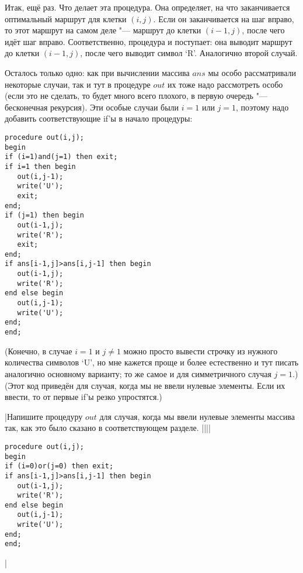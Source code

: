 Итак, ещё раз. Что делает эта процедура. Она определяет, на что заканчивается оптимальный маршрут
для клетки $(i,j)$. Если он заканчивается на шаг вправо, то этот маршрут на самом деле "--- маршрут
до клетки $(i-1,j)$, после чего идёт шаг вправо. Соответственно, процедура и поступает: она выводит
маршрут до клетки $(i-1,j)$, после чего выводит символ `R'. Аналогично второй случай.

Осталось только одно: как при вычислении массива $ans$ мы особо рассматривали некоторые случаи, так и тут в процедуре $out$ их тоже надо рассмотреть особо (если это не сделать, то будет много всего плохого, в первую очередь "--- бесконечная рекурсия). Эти особые случаи были $i=1$ или $j=1$, поэтому надо добавить соответствующие if'ы в начало процедуры:
\begin{codesampleo}\begin{verbatim}
procedure out(i,j);
begin
if (i=1)and(j=1) then exit;
if i=1 then begin
   out(i,j-1);
   write('U');
   exit;
end;
if (j=1) then begin
   out(i-1,j);
   write('R');
   exit;
end;
if ans[i-1,j]>ans[i,j-1] then begin
   out(i-1,j);
   write('R');
end else begin
   out(i,j-1);
   write('U');
end;
end;
\end{verbatim}
\end{codesampleo}
(Конечно, в случае $i=1$ и $j\neq 1$ можно просто вывести строчку из нужного количества символов
`U', но мне кажется проще и более естественно и тут писать аналогично основному варианту; то же 
самое и для симметричного случая $j=1$.) (Этот код приведён для случая, когда мы не ввели нулевые элементы. Если
их ввести, то от первые if'ы резко упростятся.)

\task|Напишите процедуру $out$ для случая, когда мы ввели нулевые элементы массива так, как это 
было сказано в соответствующем разделе.
||||
\begin{codesampleo}\begin{verbatim}
procedure out(i,j);
begin
if (i=0)or(j=0) then exit;
if ans[i-1,j]>ans[i,j-1] then begin
   out(i-1,j);
   write('R');
end else begin
   out(i,j-1);
   write('U');
end;
end;
\end{verbatim}
\end{codesampleo}
|\label{outzeroline}

